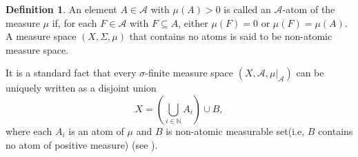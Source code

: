 \documentclass{amsart}
\theoremstyle{definition}\newtheorem{defn}[thm]{Definition}
\theoremstyle{remark}
\numberwithin{equation}{section}
\newcommand{\norm}[1]{\left\Vert#1\right\Vert}
\newcommand{\A}{\mathcal{A}}
\begin{document}
%
%
%

\begin{defn}
	 An element $A \in \A$ with $\mu(A) > 0$ is called an $\A$-atom of the measure $\mu$ if, for each $F \in \A$ with $F \subseteq A$, either $\mu(F) = 0$ or $\mu(F) = \mu(A)$. A measure space $(X, \Sigma, \mu)$ that contains no atoms is said to be non-atomic measure space.
\end{defn}
	  It is a standard fact that every $\sigma$-finite measure space $(X, \A, \mu|_{\A})$ can be  uniquely written as a disjoint union
\[
X = \left( \bigcup_{i \in \mathbb N} A_i \right) \cup B,
\]
where each $A_i$  is an atom of $\mu$ and $B$ is non-atomic measurable set(i.e, $B$ contains no atom of positive measure) (see \cite{Zaanen1967}).
\end{document}
